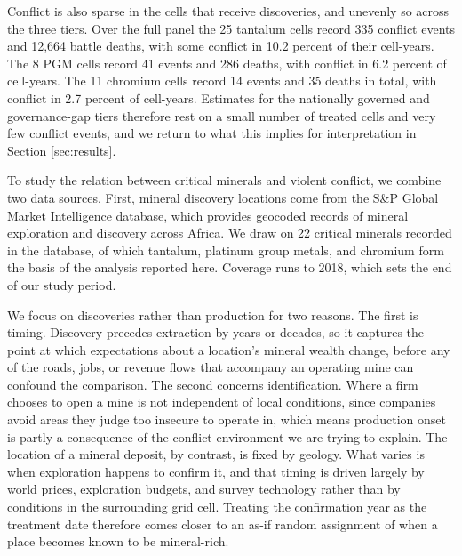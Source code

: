 \documentclass[11pt]{article}
\begin{document}
Conflict is also sparse in the cells that receive discoveries, and unevenly so across the three tiers. Over the full panel the 25 tantalum cells record 335 conflict events and 12,664 battle deaths, with some conflict in 10.2 percent of their cell-years. The 8 PGM cells record 41 events and 286 deaths, with conflict in 6.2 percent of cell-years. The 11 chromium cells record 14 events and 35 deaths in total, with conflict in 2.7 percent of cell-years. Estimates for the nationally governed and governance-gap tiers therefore rest on a small number of treated cells and very few conflict events, and we return to what this implies for interpretation in Section \ref{sec:results}.

To study the relation between critical minerals and violent conflict, we combine two data sources. First, mineral discovery locations come from the S\&P Global Market Intelligence database, which provides geocoded records of mineral exploration and discovery across Africa. We draw on 22 critical minerals recorded in the database, of which tantalum, platinum group metals, and chromium form the basis of the analysis reported here. Coverage runs to 2018, which sets the end of our study period.

We focus on discoveries rather than production for two reasons. The first is timing. Discovery precedes extraction by years or decades, so it captures the point at which expectations about a location's mineral wealth change, before any of the roads, jobs, or revenue flows that accompany an operating mine can confound the comparison. The second concerns identification. Where a firm chooses to open a mine is not independent of local conditions, since companies avoid areas they judge too insecure to operate in, which means production onset is partly a consequence of the conflict environment we are trying to explain. The location of a mineral deposit, by contrast, is fixed by geology. What varies is when exploration happens to confirm it, and that timing is driven largely by world prices, exploration budgets, and survey technology rather than by conditions in the surrounding grid cell. Treating the confirmation year as the treatment date therefore comes closer to an as-if random assignment of when a place becomes known to be mineral-rich.
\end{document}
